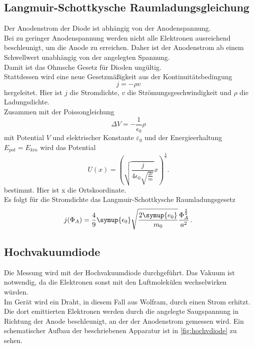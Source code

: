 \subsection{Langmuir-Schottkysche Raumladungsgleichung}
Der Anodenstrom der Diode ist abhängig von der Anodenspannung.\\
Bei zu geringer Anodenspannung werden nicht alle Elektronen ausreichend beschleunigt, um die Anode zu erreichen. 
Daher ist der Anodenstrom ab einem Schwellwert unabhängig von der angelegten Spannung.\\
Damit ist das Ohmsche Gesetz für Dioden ungültig. \\
Stattdessen wird eine neue Gesetzmäßigkeit aus der Kontinuitätsbedingung 
\begin{equation*}
j = - \rho v
\end{equation*}
hergeleitet. Hier ist $j$ die Stromdichte, $v$ die Strömungsgeschwindigkeit und $\rho$ die Ladungsdichte.\\
Zusammen mit der Poissongleichung
\begin{equation*}
\Delta V = - \frac{1}{\epsilon_0} \rho
\label{eq:poisson}
\end{equation*}
mit Potential $V$ und elektrischer Konstante $\varepsilon_0$ und der Energieerhaltung $E_{pot}=E_{kin}$ wird das Potential 
\begin{equation*}
  U(x) = \left(\sqrt{\frac{j}{4\epsilon_0\sqrt{\frac{2e}{m}}}}x\right)^{\frac{4}{3}}.
  \end{equation*}
bestimmt. Hier ist x die Ortskoordinate.\\ 
Es folgt für die Stromdichte das Langmuir-Schottkysche Raumladungsgesetz 
\begin{equation}
  j (\Phi_A)= \frac{4}{9} \symup{\epsilon_0} \sqrt{\frac{2\symup{e_{0}}}{m_{0}}} \frac{\Phi_A^{\frac{3}{2}}}{a^2} \,.
  \label{eq:lang}
\end{equation}

\subsection{Hochvakuumdiode}
Die Messung wird mit der Hochvakuumdiode durchgeführt. Das Vakuum ist notwendig, da die Elektronen sonst mit den Luftmolekülen
wechselwirken würden. \\
Im Gerät wird ein Draht, in diesem Fall aus Wolfram, durch einen Strom erhitzt. Die dort emittierten Elektronen werden durch
die angelegte Saugspannung in Richtung der Anode beschleunigt, an der der Anodenstrom gemessen wird. Ein schematischer Aufbau der beschriebenen Apparatur ist in \autoref{fig:hochvdiode} zu sehen.

